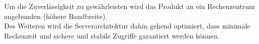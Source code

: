Um die Zuverlässigkeit zu gewährleisten wird das Produkt an ein Rechenzentrum angebunden (höhere Bandbreite).\\
Des Weiteren wird die Serverarchitektur dahin gehend optimiert, dass minimale Rechenzeit und sichere und stabile Zugriffe garantiert werden können.